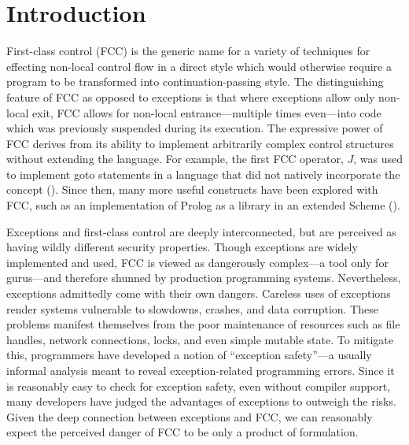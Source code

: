 \documentclass[11pt]{article}
\begin{document}
\newpage
\vspace*{-0.2in}
\tableofcontents

\newpage
\listoffigures

\newpage{}
\section{Introduction}

First-class control (FCC) is the generic name for a variety of techniques for effecting non-local control flow in a direct style which would otherwise require a program to be transformed into continuation-passing style.
The distinguishing feature of FCC as opposed to exceptions is that where exceptions allow only non-local exit, FCC allows for non-local entrance---multiple times even---into code which was previously suspended during its execution.
The expressive power of FCC derives from its ability to implement arbitrarily complex control structures without extending the language.
For example, the first FCC operator, $J$, was used to implement goto statements in a language that did not natively incorporate the concept (\cite{ISWIM}).
Since then, many more useful constructs have been explored with FCC, such as an implementation of Prolog as a library in an extended Scheme (\cite{HandlingControl}).


Exceptions and first-class control are deeply interconnected, but are perceived as having wildly different security properties.
Though exceptions are widely implemented and used, FCC is viewed as dangerously complex---a tool only for gurus---and therefore shunned by production programming systems.
Nevertheless, exceptions admittedly come with their own dangers.
Careless uses of exceptions render systems vulnerable to slowdowns, crashes, and data corruption.
These problems manifest themselves from the poor maintenance of resources such as file handles, network connections, locks, and even simple mutable state.
To mitigate this, programmers have developed a notion of ``exception safety''---a usually informal analysis meant to reveal exception-related programming errors.
Since it is reasonably easy to check for exception safety, even without compiler support, many developers have judged the advantages of exceptions to outweigh the risks.
Given the deep connection between exceptions and FCC, we can reasonably expect the perceived danger of FCC to be only a product of formulation.
\end{document}
